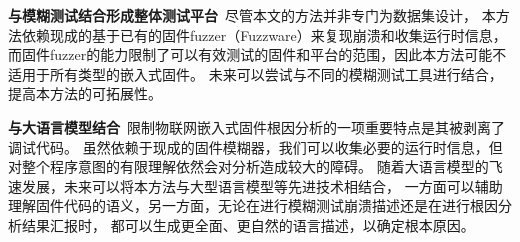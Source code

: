 \textbf{与模糊测试结合形成整体测试平台}\ 尽管本文的方法并非专门为数据集设计，
本方法依赖现成的基于已有的固件fuzzer（Fuzzware）来复现崩溃和收集运行时信息，
而固件fuzzer的能力限制了可以有效测试的固件和平台的范围，因此本方法可能不适用于所有类型的嵌入式固件。
未来可以尝试与不同的模糊测试工具进行结合，提高本方法的可拓展性。


\textbf{与大语言模型结合}\ 限制物联网嵌入式固件根因分析的一项重要特点是其被剥离了调试代码。
虽然依赖于现成的固件模糊器，我们可以收集必要的运行时信息，但对整个程序意图的有限理解依然会对分析造成较大的障碍。
随着大语言模型的飞速发展，未来可以将本方法与大型语言模型等先进技术相结合，
一方面可以辅助理解固件代码的语义，另一方面，无论在进行模糊测试崩溃描述还是在进行根因分析结果汇报时，
都可以生成更全面、更自然的语言描述，以确定根本原因。
